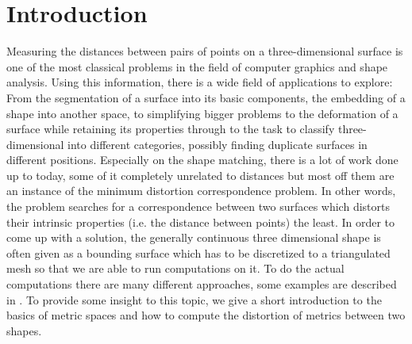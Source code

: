 \chapter{Introduction}
\label{chapter:introduction}

Measuring the distances between pairs of points on a three-dimensional surface is one of the most classical problems in the field of computer graphics and shape analysis.
Using this information, there is a wide field of applications to explore:
From the segmentation of a surface into its basic components, the embedding of a shape into another space, to simplifying bigger problems to the deformation of a surface while retaining its properties  through to the task to classify three-dimensional into different categories, possibly finding duplicate surfaces in different positions.
Especially on the shape matching, there is a lot of work done up to today, some of it completely unrelated to distances but most off them are an instance of the minimum distortion correspondence problem.
In other words, the problem searches for a correspondence between two surfaces which distorts their intrinsic properties (i.e. the distance between points) the least.
In order to come up with a solution, the generally continuous three dimensional shape is often given as a bounding surface which has to be discretized to a triangulated mesh so that we are able to run computations on it.
To do the actual computations there are many different approaches, some examples are described in \cite{rodola2012game,bronstein2006generalized,memoli2009spectral}.
To provide some insight to this topic, we give a short introduction to the basics of metric spaces and how to compute the distortion of metrics between two shapes.

